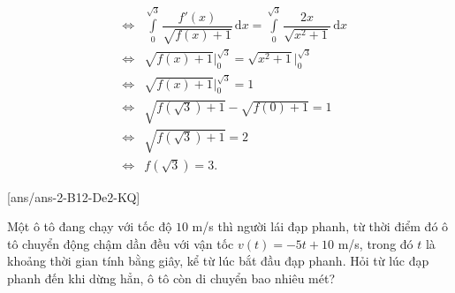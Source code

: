 \begin{ex}
{\begin{itemchoice}
\begin{eqnarray*}
			& \Leftrightarrow& \displaystyle\int\limits_{0}^{\sqrt{3}} \dfrac{f'(x)}{\sqrt{f(x)+1}} \mathrm{\,d}x=\int\limits_{0}^{\sqrt{3}} \dfrac{2x}{\sqrt{x^2+1}} \mathrm{\,d}x\\ &\Leftrightarrow& \sqrt{f(x)+1}\Big|_{0} ^{\sqrt{3}}=\sqrt{x^2+1}\Big|_{0}^{\sqrt{3}}\\
			& \Leftrightarrow& \sqrt{f(x)+1}\Big|_{0} ^{\sqrt{3}}=1 \\
			& \Leftrightarrow& \sqrt{f(\sqrt{3})+1}-\sqrt{f(0)+1}=1\\
			& \Leftrightarrow& \sqrt{f(\sqrt{3})+1}=2\\ 
			&\Leftrightarrow& f(\sqrt{3})=3.
			\end{eqnarray*}
		\end{itemchoice}
	}
\end{ex}

[ans/ans-2-B12-De2-KQ]
\caukq
\begin{ex}%
	Một ô tô đang chạy với tốc độ $10$ m/s thì người lái đạp phanh, từ thời điểm đó ô tô chuyển động chậm dần đều với vận tốc $v(t)=-5t+10$ m/s, trong đó $t$ là khoảng thời gian tính bằng giây, kể từ lúc bắt đầu đạp phanh. Hỏi từ lúc đạp phanh đến khi dừng hẳn, ô tô còn di chuyển bao nhiêu mét?
\end{ex}

